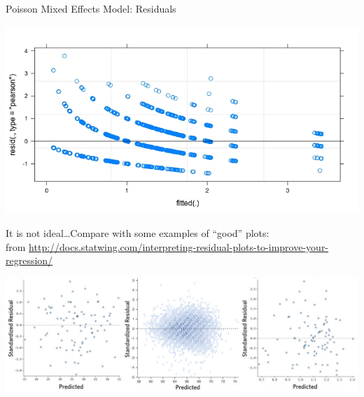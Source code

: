 \documentclass[13pt, t]{beamer}
\begin{document}
\begin{frame}{Poisson Mixed Effects Model: Residuals}
\begin{center}
\includegraphics[width=0.75\linewidth]{images/14_poisson_residuals_750_400}\\
\end{center}\pause
It is not ideal\dots Compare with some examples of ``good'' plots:\\
{\tiny from \url{http://docs.statwing.com/interpreting-residual-plots-to-improve-your-regression/}}
\begin{center}
\includegraphics[width=0.7\linewidth]{images/16_good_residuals}
\end{center}
\end{frame}
\end{document}
